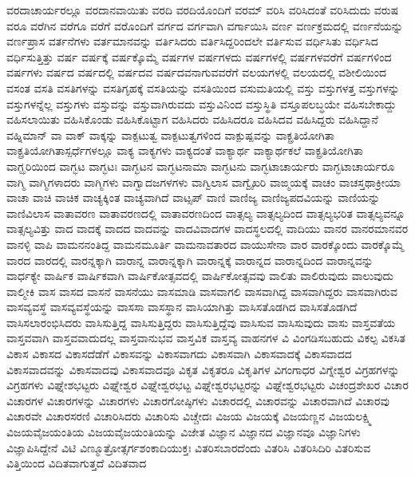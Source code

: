 {ವರದಾಚಾರ್ಯರಲ್ಲೂ
ವರದಾನವಾಯಿತು
ವರದಿ
ವರದಿಯೊಂದಿಗೆ
ವರಮ್
ವರಿಸಿ
ವರಿಸಿದಂತೆ
ವರಿಸಿದುದು
ವರುಷ
ವರೂ
ವರೆಗಿನ
ವರೆಗೂ
ವರೆಗೆ
ವರೊಂದಿಗೆ
ವರ್ಗದ
ವರ್ಗವಾಗಿ
ವರ್ಗಾಯಿಸಿ
ವರ್ಣ
ವರ್ಣಕ್ರಮದಲ್ಲಿ
ವರ್ಣನೆಯನ್ನು
ವರ್ಣಪ್ರಾಸ
ವರ್ತನೆಗಳು
ವರ್ತಮಾನವನ್ನು
ವರ್ತಿಸಿದರು
ವರ್ತಿಸಿದ್ದರಿಂದಲೇ
ವರ್ತಿಸುವ
ವರ್ಧಿಸಿತು
ವರ್ಧಿಸಿದ
ವರ್ಧಿಸುತ್ತಿತ್ತು
ವರ್ಷ
ವರ್ಷಕ್ಕೆ
ವರ್ಷಕ್ಕೊಮ್ಮೆ
ವರ್ಷಗಳ
ವರ್ಷಗಳದು
ವರ್ಷಗಳಲ್ಲಿ
ವರ್ಷಗಳವರೆಗೆ
ವರ್ಷಗಳಿಂದ
ವರ್ಷಗಳು
ವರ್ಷದ
ವರ್ಷದಲ್ಲಿ
ವರ್ಷದವ
ವರ್ಷದವನಾಗುವವರೆಗೆ
ವಲಯಗಳಲ್ಲಿ
ವಲಯದಲ್ಲಿ
ವಶೀಲಿಯಿಂದ
ವಸಂತ
ವಸತಿ
ವಸತಿಗಳನ್ನು
ವಸತಿಗೃಹಕ್ಕೆ
ವಸತಿಯನ್ನು
ವಸತಿಯಿಂದ
ವಸುಮತಿಯಲ್ಲಿ
ವಸ್ತು
ವಸ್ತುಗಳತ್ತ
ವಸ್ತುಗಳನ್ನು
ವಸ್ತುಗಳನ್ನೆಲ್ಲ
ವಸ್ತುಗಳು
ವಸ್ತುವನ್ನು
ವಸ್ತುವಾಗಿರುವದು
ವಸ್ತುವಿನಿಂದ
ವಸ್ತುಸ್ಥಿತಿ
ವಸ್ತೂಪಲಬ್ಧಯೇ
ವಹಿಸಬೇಕಾದ್ದು
ವಹಿಸಲಾಯಿತು
ವಹಿಸಿಕೊಂಡು
ವಹಿಸಿಕೊಟ್ಟಾಗ
ವಹಿಸಿದರು
ವಹಿಸಿದರೂ
ವಹಿಸಿದವ
ವಹಿಸಿದ್ದರು
ವಹಿಸಿದ್ದಾನೆ
ವಹ್ನಿಮಾನ್
ವಾ
ವಾಕ್
ವಾಕ್ಕನ್ನು
ವಾಕ್ಪಟುತ್ವ
ವಾಕ್ಪಟುತ್ವಗಳಿಂದ
ವಾಕ್ಪುಷ್ಪವನ್ನು
ವಾಕ್ಪ್ರತಿಯೋಗಿತಾ
ವಾಕ್ಪ್ರತಿಯೋಗಿತಾಸ್ಪರ್ಧೆಗಳಲ್ಲೂ
ವಾಕ್ಯ
ವಾಕ್ಯಗಳು
ವಾಕ್ಯದಂತೆ
ವಾಕ್ಯಾರ್ಥ
ವಾಕ್ಯಾರ್ಥಕಲೆ
ವಾಕ್ಪ್ರತಿಯೋಗಿತಾ
ವಾಗ್ಝರಿಯಿಂದ
ವಾಗ್ಭಟ
ವಾಗ್ಭಟಃ
ವಾಗ್ಭಟನ
ವಾಗ್ಭಟನಾಮಾ
ವಾಗ್ಭಟನು
ವಾಗ್ಭಟಾಚಾರ್ಯರು
ವಾಗ್ಭಟಾಚಾರ್ಯರೂ
ವಾಗ್ಮಿ
ವಾಗ್ಮಿಗಳಾದರು
ವಾಗ್ಮಿಗಳು
ವಾಗ್ವಾದಜಗಳಗಳು
ವಾಗ್ವಿಲಾಸ
ವಾಗ್ವೈಖರಿ
ವಾಙ್ಮಯಕ್ಕೆ
ವಾಚಂ
ವಾಚಸ್ತಥಾಕ್ರೀಯಾ
ವಾಚಾ
ವಾಚಿ
ವಾಚಿಕ
ವಾಚ್ಯಕ್ಕಿಂತ
ವಾಚ್ಯವಾಗಿದೆ
ವಾಟ್ಸಪ್
ವಾಣಿ
ವಾಣಿಜ್ಯ
ವಾಣಿಜ್ಯಪದವಿಯನ್ನು
ವಾಣಿಯನ್ನು
ವಾಣಿವಿಲಾಸ
ವಾತಾವರಣ
ವಾತಾವರಣದಲ್ಲಿ
ವಾತಾವರಣದಿಂದ
ವಾತ್ಸಲ್ಯ
ವಾತ್ಸಲ್ಯದಿಂದ
ವಾತ್ಸಲ್ಯಭರಿತ
ವಾತ್ಸಲ್ಯವನ್ನೂ
ವಾತ್ಸಲ್ಯವಿತ್ತು
ವಾದ
ವಾದಕ್ಕೆ
ವಾದದ
ವಾದವನ್ನು
ವಾದವಿವಾದಗಳ
ವಾದಸ್ಥಲದಲ್ಲಿ
ವಾದಿಯು
ವಾನರ
ವಾನರಮಾನವರ
ವಾನಳ್ಳಿ
ವಾಪಿ
ವಾಮನನಂತಿದ್ದ
ವಾಮನಮೂರ್ತಿ
ವಾಮನಾವತಾರದ
ವಾಯುಸೇನಾ
ವಾರ
ವಾರಕ್ಕೊಂದು
ವಾರಕ್ಕೊಮ್ಮೆ
ವಾರದ
ವಾರದಲ್ಲಿ
ವಾರನ್ನಕ್ಕಾಗಿ
ವಾರಾನ್ನ
ವಾರಾನ್ನಕ್ಕಾಗಿ
ವಾರಾನ್ನಕ್ಕೆ
ವಾರಾನ್ನದ
ವಾರಾನ್ನದಿಂದ
ವಾರಾನ್ನವನ್ನು
ವಾರ್ಧಕ್ಯೇ
ವಾರ್ಷಿಕ
ವಾರ್ಷಿಕವಾಗಿ
ವಾರ್ಷಿಕೋತ್ಸವದಲ್ಲಿ
ವಾರ್ಷಿಕೋತ್ಸವವು
ವಾಲಿತು
ವಾಲಿರುವುದು
ವಾಲುವುದು
ವಾಲ್ಮೀಕಿ
ವಾಸ
ವಾಸದ
ವಾಸನೆ
ವಾಸನೆಯು
ವಾಸಮಾಡಿ
ವಾಸವಾಗಲಿ
ವಾಸವಾಗಿದ್ದ
ವಾಸವಾಗಿದ್ದರು
ವಾಸವಾಗಿರುವ
ವಾಸವ್ಯವಸ್ಥೆ
ವಾಸವ್ಯವಸ್ಥೆಯನ್ನು
ವಾಸಸಾ
ವಾಸಸ್ಥಾನ
ವಾಸಿಯಾಗಿತ್ತು
ವಾಸಿಸತೊಡಗಿದ
ವಾಸಿಸತೊಡಗಿದೆ
ವಾಸಿಸಲಾರಂಭಿಸಿದರು
ವಾಸಿಸುತ್ತಿದ್ದ
ವಾಸಿಸುತ್ತಿದ್ದರು
ವಾಸಿಸುತ್ತಿದ್ದೆವು
ವಾಸಿಸುವ
ವಾಸಿಸುವುದು
ವಾಸು
ವಾಸ್ತವತೆಯ
ವಾಸ್ತವವಾಗಿ
ವಾಸ್ತವವಾದುದಲ್ಲ
ವಾಸ್ತವಾನುಭವ
ವಾಸ್ತವಿಕ
ವಾಸ್ತವ್ಯ
ವಾಹನಗಳ
ವಿ
ವಿಂಗಡಿಸಬಹುದು
ವಿಕಲ್ಪ
ವಿಕಸಿತ
ವಿಕಾಸ
ವಿಕಾಸದ
ವಿಕಾಸದೆಡೆಗೆ
ವಿಕಾಸವನ್ನು
ವಿಕಾಸವಾಗದು
ವಿಕಾಸವಾಗಿ
ವಿಕಾಸವಾದಕ್ಕೆ
ವಿಕಾಸವಾದದ
ವಿಕಾಸವಾದವನ್ನು
ವಿಕಾಸವಾದವು
ವಿಕಾಸವಾದವೂ
ವಿಕೃತ
ವಿಕೃತರೂ
ವಿಕೃತಿಗಳ
ವಿಗಂಗಾಧರ
ವಿಗ್ನೇಶ್ವರ
ವಿಗ್ರಹಗಳನ್ನು
ವಿಗ್ರಹಗಳು
ವಿಘ್ನೇಶಭಟ್ಟರು
ವಿಘ್ನೇಶ್ವರ
ವಿಘ್ನೇಶ್ವರಭಟ್ಟ
ವಿಘ್ನೇಶ್ವರಭಟ್ಟರನ್ನು
ವಿಘ್ನೇಶ್ವರಭಟ್ಟರು
ವಿಚಂದ್ರಶೇಖರ
ವಿಚಾರ
ವಿಚಾರಗಳ
ವಿಚಾರಗಳನ್ನು
ವಿಚಾರಗಳು
ವಿಚಾರಗೋಷ್ಠಿಗಳು
ವಿಚಾರದಲ್ಲಿ
ವಿಚಾರವನ್ನು
ವಿಚಾರವಾಗಿದೆ
ವಿಚಾರವು
ವಿಚಾರವೇ
ವಿಚಾರಸರಣಿ
ವಿಚಾರಿಸಿದರು
ವಿಚಾರಿಸು
ವಿಚ್ಚೇದಃ
ವಿಜಯ
ವಿಜಯಕ್ಕೆ
ವಿಜಯಣ್ಣನ
ವಿಜಯಲಕ್ಷ್ಮಿ
ವಿಜಯವೈಜಯಂತಿಯ
ವಿಜಯವೈಜಯಂತಿಯನ್ನು
ವಿಜೇತ
ವಿಜ್ಞಾನ
ವಿಜ್ಞಾನದ
ವಿಜ್ಞಾನವೂ
ವಿಜ್ಞಾನಿಗಳು
ವಿಜ್ಞಾಪಿಸಿದ್ದೇನೆ
ವಿಟಿ
ವಿಣ್ಮೂತ್ರೋತ್ಸರ್ಗಶಂಕಾದಿಯುಕ್ತಃ
ವಿತರಿಸಬಾರದೆಂದು
ವಿತರಿಸಿ
ವಿತರಿಸಿದಿರಿ
ವಿತರಿಸುವ
ವಿತ್ತಿಯಿಂದ
ವಿದಿತವಾಗುತ್ತದೆ
ವಿದಿತವಾದ
}
